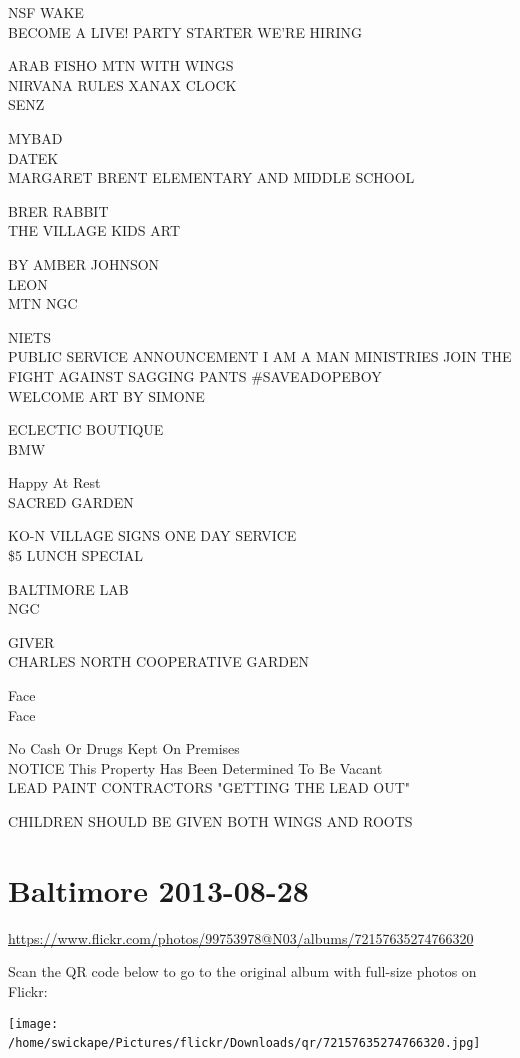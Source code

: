 \documentclass[10pt,letterpaper]{article}
\begin{document}
NSF WAKE\\
BECOME A LIVE! PARTY STARTER WE'RE HIRING

ARAB FISHO MTN WITH WINGS\\
NIRVANA RULES XANAX CLOCK\\
SENZ

MYBAD\\
DATEK\\
MARGARET BRENT ELEMENTARY AND MIDDLE SCHOOL

BRER RABBIT\\
THE VILLAGE KIDS ART

BY AMBER JOHNSON\\
LEON\\
MTN NGC

NIETS\\
PUBLIC SERVICE ANNOUNCEMENT I AM A MAN MINISTRIES JOIN THE FIGHT AGAINST SAGGING PANTS \#SAVEADOPEBOY\\
WELCOME ART BY SIMONE

ECLECTIC BOUTIQUE\\
BMW

Happy At Rest\\
SACRED GARDEN

KO{-}N VILLAGE SIGNS ONE DAY SERVICE\\
\$5 LUNCH SPECIAL

BALTIMORE LAB\\
NGC

GIVER\\
CHARLES NORTH COOPERATIVE GARDEN

Face\\
Face

No Cash Or Drugs Kept On Premises\\
NOTICE This Property Has Been Determined To Be Vacant\\
LEAD PAINT CONTRACTORS "GETTING THE LEAD OUT"

CHILDREN SHOULD BE GIVEN BOTH WINGS AND ROOTS
\

\section*{Baltimore 2013-08-28}

\url{https://www.flickr.com/photos/99753978@N03/albums/72157635274766320}

Scan the QR code below to go to the original album with full-size photos on Flickr:

\texttt{[image: /home/swickape/Pictures/flickr/Downloads/qr/72157635274766320.jpg]}
\
\end{document}
